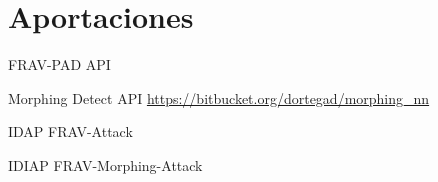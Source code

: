 \chapter{Aportaciones\label{ch:aportaciones}}\label{apendix:ApendiceAportaciones}

FRAV-PAD API

Morphing Detect API 
\url{https://bitbucket.org/dortegad/morphing_nn}

IDAP  FRAV-Attack

IDIAP FRAV-Morphing-Attack




